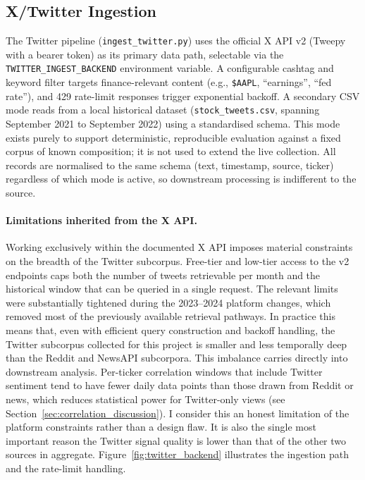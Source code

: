 \subsection{X/Twitter Ingestion}
\label{sec:twitter_ingestion}

The Twitter pipeline (\texttt{ingest\_twitter.py}) uses the official X API v2 (Tweepy with a bearer token) as its primary data path, selectable via the \texttt{TWITTER\_INGEST\_BACKEND} environment variable. A configurable cashtag and keyword filter targets finance-relevant content (e.g., \texttt{\$AAPL}, ``earnings'', ``fed rate''), and 429 rate-limit responses trigger exponential backoff. A secondary CSV mode reads from a local historical dataset (\texttt{stock\_tweets.csv}, spanning September 2021 to September 2022) using a standardised schema. This mode exists purely to support deterministic, reproducible evaluation against a fixed corpus of known composition; it is not used to extend the live collection. All records are normalised to the same schema (text, timestamp, source, ticker) regardless of which mode is active, so downstream processing is indifferent to the source.

\paragraph{Limitations inherited from the X API.}
Working exclusively within the documented X API imposes material constraints on the breadth of the Twitter subcorpus. Free-tier and low-tier access to the v2 endpoints caps both the number of tweets retrievable per month and the historical window that can be queried in a single request. The relevant limits were substantially tightened during the 2023--2024 platform changes, which removed most of the previously available retrieval pathways. In practice this means that, even with efficient query construction and backoff handling, the Twitter subcorpus collected for this project is smaller and less temporally deep than the Reddit and NewsAPI subcorpora. This imbalance carries directly into downstream analysis. Per-ticker correlation windows that include Twitter sentiment tend to have fewer daily data points than those drawn from Reddit or news, which reduces statistical power for Twitter-only views (see Section~\ref{sec:correlation_discussion}). I consider this an honest limitation of the platform constraints rather than a design flaw. It is also the single most important reason the Twitter signal quality is lower than that of the other two sources in aggregate. Figure~\ref{fig:twitter_backend} illustrates the ingestion path and the rate-limit handling.

